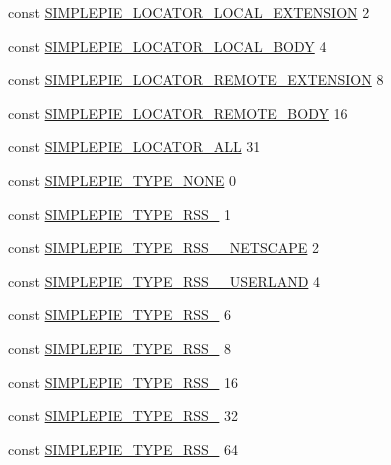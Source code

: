 \begin{DoxyCompactItemize}
const \hyperlink{simplepie_8inc_a2096bb81875b5132817c0012d281de67}{S\-I\-M\-P\-L\-E\-P\-I\-E\-\_\-\-L\-O\-C\-A\-T\-O\-R\-\_\-\-L\-O\-C\-A\-L\-\_\-\-E\-X\-T\-E\-N\-S\-I\-O\-N} 2
\item 
const \hyperlink{simplepie_8inc_a2300fe90d0b3ea85970ae5b29de7792f}{S\-I\-M\-P\-L\-E\-P\-I\-E\-\_\-\-L\-O\-C\-A\-T\-O\-R\-\_\-\-L\-O\-C\-A\-L\-\_\-\-B\-O\-D\-Y} 4
\item 
const \hyperlink{simplepie_8inc_a2ff1da5e6b2da7c22b22e0d1e108d529}{S\-I\-M\-P\-L\-E\-P\-I\-E\-\_\-\-L\-O\-C\-A\-T\-O\-R\-\_\-\-R\-E\-M\-O\-T\-E\-\_\-\-E\-X\-T\-E\-N\-S\-I\-O\-N} 8
\item 
const \hyperlink{simplepie_8inc_a9ef3832108fc772ee0c436aff6a625bf}{S\-I\-M\-P\-L\-E\-P\-I\-E\-\_\-\-L\-O\-C\-A\-T\-O\-R\-\_\-\-R\-E\-M\-O\-T\-E\-\_\-\-B\-O\-D\-Y} 16
\item 
const \hyperlink{simplepie_8inc_a77835b708f60cde39bf93958e683a5f1}{S\-I\-M\-P\-L\-E\-P\-I\-E\-\_\-\-L\-O\-C\-A\-T\-O\-R\-\_\-\-A\-L\-L} 31
\item 
const \hyperlink{simplepie_8inc_a2522cf3d1d9e4ff688435bcaaa34afe7}{S\-I\-M\-P\-L\-E\-P\-I\-E\-\_\-\-T\-Y\-P\-E\-\_\-\-N\-O\-N\-E} 0
\item 
const \hyperlink{simplepie_8inc_a10644820ee2d8fb3f1eaeb81283c4ccd}{S\-I\-M\-P\-L\-E\-P\-I\-E\-\_\-\-T\-Y\-P\-E\-\_\-\-R\-S\-S\-\_} 1
\item 
const \hyperlink{simplepie_8inc_a94d5b6757603b451892f50ba78c2533a}{S\-I\-M\-P\-L\-E\-P\-I\-E\-\_\-\-T\-Y\-P\-E\-\_\-\-R\-S\-S\-\_\-\_\-\-N\-E\-T\-S\-C\-A\-P\-E} 2
\item 
const \hyperlink{simplepie_8inc_a15ce2fe24c88e2e3bc7fc831b4439316}{S\-I\-M\-P\-L\-E\-P\-I\-E\-\_\-\-T\-Y\-P\-E\-\_\-\-R\-S\-S\-\_\-\_\-\-U\-S\-E\-R\-L\-A\-N\-D} 4
\item 
const \hyperlink{simplepie_8inc_a720edec10788020c5417c2a697903e06}{S\-I\-M\-P\-L\-E\-P\-I\-E\-\_\-\-T\-Y\-P\-E\-\_\-\-R\-S\-S\-\_} 6
\item 
const \hyperlink{simplepie_8inc_abb6da0ec041150f0dda721f15d4cc30e}{S\-I\-M\-P\-L\-E\-P\-I\-E\-\_\-\-T\-Y\-P\-E\-\_\-\-R\-S\-S\-\_} 8
\item 
const \hyperlink{simplepie_8inc_a8f547d774ea35d5b07b9b73e27b776ac}{S\-I\-M\-P\-L\-E\-P\-I\-E\-\_\-\-T\-Y\-P\-E\-\_\-\-R\-S\-S\-\_} 16
\item 
const \hyperlink{simplepie_8inc_a9b44ed65ab248d80bbdc0552cb12b973}{S\-I\-M\-P\-L\-E\-P\-I\-E\-\_\-\-T\-Y\-P\-E\-\_\-\-R\-S\-S\-\_} 32
\item 
const \hyperlink{simplepie_8inc_aac2c4954a4b922d76f5e2cdcfe27e458}{S\-I\-M\-P\-L\-E\-P\-I\-E\-\_\-\-T\-Y\-P\-E\-\_\-\-R\-S\-S\-\_} 64

\end{DoxyCompactItemize}
